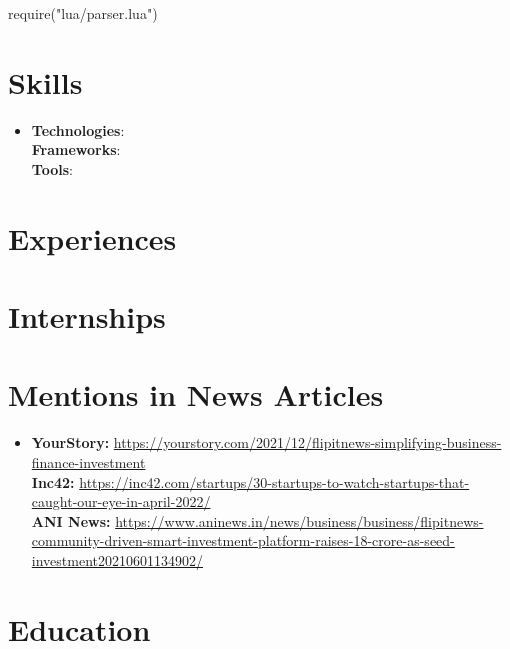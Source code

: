 \documentclass[letterpaper,11pt]{article}
\newcommand{\resumeSubHeadingListStart}{\begin{itemize}[leftmargin=*,label={}]}
\newcommand{\resumeSubHeadingListEnd}{\end{itemize}}
\begin{document}
\begin{luacode}
require("lua/parser.lua")
\end{luacode}


\section{Skills}
  \resumeSubHeadingListStart
    \item{
      \textbf{Technologies}{: }
      \\
      \textbf{Frameworks}{: }
      \\
      \textbf{Tools}{: }
      }
  \resumeSubHeadingListEnd

\section{Experiences}
  \resumeSubHeadingListStart
  \resumeSubHeadingListEnd

\section{Internships}
  \resumeSubHeadingListStart
  \resumeSubHeadingListEnd

\section{Mentions in News Articles}
  \resumeSubHeadingListStart
    \item {
        \textbf{YourStory:} \url{https://yourstory.com/2021/12/flipitnews-simplifying-business-finance-investment}
        \\
        \textbf{Inc42:} \url{https://inc42.com/startups/30-startups-to-watch-startups-that-caught-our-eye-in-april-2022/}
        \\
        \textbf{ANI News:} \url{https://www.aninews.in/news/business/business/flipitnews-community-driven-smart-investment-platform-raises-18-crore-as-seed-investment20210601134902/}
    }
  \resumeSubHeadingListEnd

\section{Education}
  \resumeSubHeadingListStart
  \resumeSubHeadingListEnd
\end{document}
